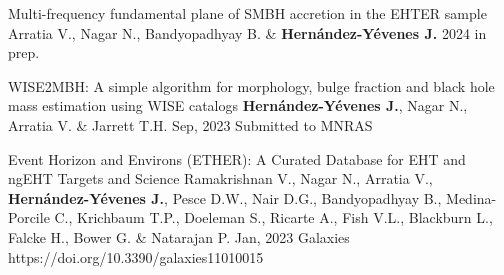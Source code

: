 
\begin{cvpublications}{}
\iffalse
	 \cvpublication{5}
	 {Event Horizon and Environment (ETHER): I. Five Black Holes at 50–100 Schwarzchild Radii Resolution with the Event Horizon Telescope}
	 {Ramakrishnan V., Nagar N., Arevalo P., Arratia V., \textbf{Hernández-Yévenes J.}, Pesce D.W., Nair D.G., Bandyopadhyay B., Sasikumar S.,  Tiede P., Doeleman S., Blackburn L. \& EHT Collaboration}
	 {2024}
     {in prep.}
     {}

	 \cvpublication{4}
	 {Comparing supermassive black hole mass estimates from WISE2MBH using AllWISE and WXSC with the literature}
	 {\textbf{Hernández-Yévenes J.}, Nagar N., Arratia V., Cluver M.E. \& Jarrett T.H.}
	 {2024}
     {in prep.}
     {}

\fi

	 {Multi-frequency fundamental plane of SMBH accretion in the EHTER sample}
	 {Arratia V., Nagar N., Bandyopadhyay B. \& \textbf{Hernández-Yévenes J.}}
	 {2024}
     {in prep.}
     {}
     
	 {WISE2MBH: A simple algorithm for morphology, bulge fraction and black hole mass estimation using WISE catalogs}
	 {\textbf{Hernández-Yévenes J.}, Nagar N., Arratia V. \& Jarrett T.H.}
	 {Sep, 2023}
     {Submitted to MNRAS}
     {}

	{Event Horizon and Environs (ETHER): A Curated Database for EHT and ngEHT Targets and Science}
	{Ramakrishnan V., Nagar N., Arratia V., \textbf{Hernández-Yévenes J.}, Pesce D.W., Nair D.G., Bandyopadhyay B., Medina-Porcile C.,  Krichbaum T.P., Doeleman S., Ricarte A., Fish V.L., Blackburn L., Falcke H., Bower G. \& Natarajan P.}
    {Jan, 2023}
	{Galaxies}
    {https://doi.org/10.3390/galaxies11010015}

\end{cvpublications}
